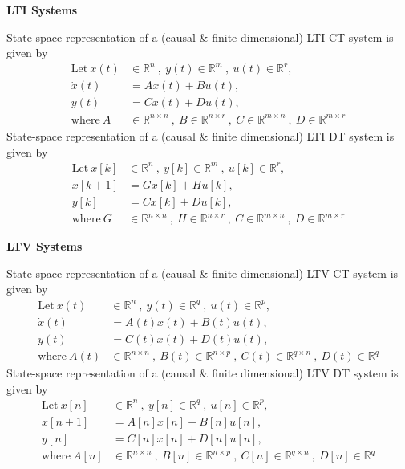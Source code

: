\documentclass[twoside]{article}
\begin{document}
\textbf{LTI Systems}

State-space representation of a (causal \& finite-dimensional) LTI CT system is given by
%
\begin{align*}
  \mathrm{Let} \ x(t) &\in \mathbb{R}^n \ , \ y(t) \in \mathbb{R}^m \ ,\  u(t) \in
  \mathbb{R}^r , \\
  \dot{x}(t) &= A x(t) + B u(t) , \\
  y(t) &= C x(t) + D u(t) , \\
  \mathrm{where} \ A &\in \mathbb{R}^{n \times n} \ , \ 
    B \in \mathbb{R}^{n \times r} \ ,\  C \in \mathbb{R}^{m \times n} \ , \ D \in \mathbb{R}^{m \times r}
\end{align*}
%
State-space representation of a (causal \& finite dimensional) LTI DT system is given by
%
\begin{align*}
  \mathrm{Let} \ x[k] &\in \mathbb{R}^n \ , \ y[k] \in \mathbb{R}^m \ ,\  u[k] \in
  \mathbb{R}^r , \\
  x[k+1] &= G x[k] + H u[k] , \\
  y[k] &= C x[k] + D u[k] , \\
  \mathrm{where} \ G &\in \mathbb{R}^{n \times n} \ , \ 
    H \in \mathbb{R}^{n \times r} \ ,\  C \in \mathbb{R}^{m \times n} \ , \ D \in \mathbb{R}^{m \times r}
\end{align*}
%

\textbf{LTV Systems}

State-space representation of a (causal \& finite dimensional) LTV CT system is given by
%
\begin{align*}
  \mathrm{Let} \ x(t) &\in \mathbb{R}^n \ , \ y(t) \in \mathbb{R}^q \ ,\  u(t) \in
  \mathbb{R}^p , \\
  \dot{x}(t) &= A(t) x(t) + B(t) u(t) , \\
  y(t) &= C(t) x(t) + D(t) u(t) , \\
  \mathrm{where} \ A(t) &\in \mathbb{R}^{n \times n} \ , \ 
    B(t) \in \mathbb{R}^{n \times p} \ ,\  C(t) \in \mathbb{R}^{q \times n} \ , \ D(t) \in \mathbb{R}^q
\end{align*}
%
State-space representation of a (causal \& finite dimensional) LTV DT system is given by
%
\begin{align*}
  \mathrm{Let} \ x[n] &\in \mathbb{R}^n \ , \ y[n] \in \mathbb{R}^q \ ,\  u[n] \in
  \mathbb{R}^p , \\
  x[n+1] &= A[n] x[n] + B[n] u[n] , \\
  y[n] &= C[n] x[n] + D[n] u[n] , \\
  \mathrm{where} \ A[n] &\in \mathbb{R}^{n \times n} \ , \ 
    B[n] \in \mathbb{R}^{n \times p} \ ,\  C[n] \in \mathbb{R}^{q
                          \times  n} \ , \ D[n] \in \mathbb{R}^q
\end{align*}
\end{document}
